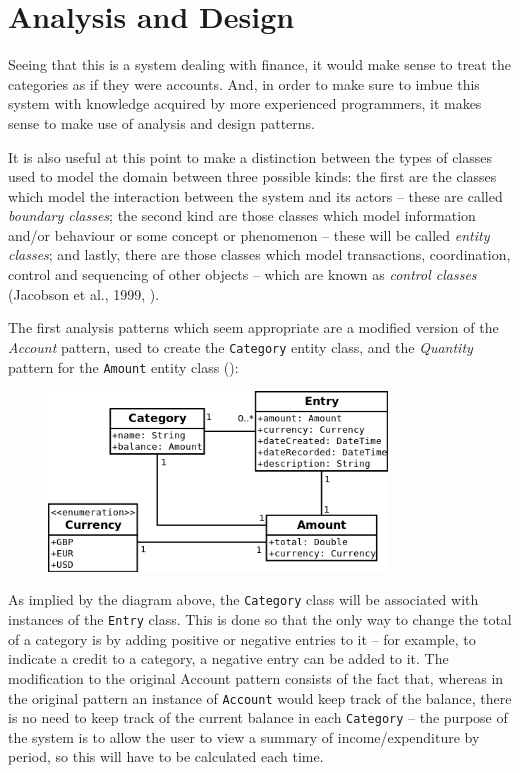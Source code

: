 \section{Analysis and Design} \label{sec:Design}

Seeing that this is a system dealing with finance, it would make sense to treat
the categories as if they were accounts. And, in order to make sure to imbue
this system with knowledge acquired by more experienced programmers, it makes
sense to make use of analysis and design patterns.

It is also useful at this point to make a distinction between the types of
classes used to model the domain between three possible kinds: the first are
the classes which model the interaction between the system and its actors --
these are called \emph{boundary classes}; the second kind are those classes
which model information and/or behaviour or some concept or phenomenon -- these
will be called \emph{entity classes}; and lastly, there are those classes which
model transactions, coordination, control and sequencing of other objects --
which are known as \emph{control classes} (Jacobson et al., 1999,
\cite[cited][pp.~198-201]{bennett2010object}).

The first analysis patterns which seem appropriate are a modified version of
the \emph{Account} pattern, used to create the \texttt{Category} entity class,
and the \emph{Quantity} pattern for the \texttt{Amount} entity class
(\cite[][Sections~6.1~\&~3.1]{fowler1997analysis}):
\begin{figure}[ht!]
  \begin{center}
    \includegraphics[width=9cm]{./contents/img/Class_Diagram_-_Categories_and_Amount.png}
  \end{center}
  \caption{}
  \label{fig:ClassDiagram.CategoriesAndAmount}
\end{figure}
\FloatBarrier

As implied by the diagram above, the \texttt{Category} class will be associated
with instances of the \texttt{Entry} class. This is done so that the only way to
change the total of a category is by adding positive or negative entries to it
-- for example, to indicate a credit to a category, a negative entry can be
added to it. The modification to the original Account pattern consists of the
fact that, whereas in the original pattern an instance of \texttt{Account}
would keep track of the balance, there is no need to keep track of the current
balance in each \texttt{Category} -- the purpose of the system is to allow the
user to view a summary of income/expenditure by period, so this will have to be
calculated each time.


